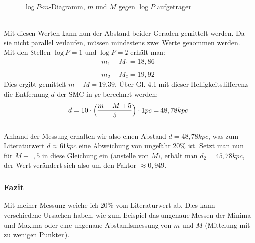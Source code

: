 \documentclass[12pt]{article}
\begin{document}
\begin{figure}[h!]
    \centering
{}
\caption[short]{$\log P$-$m$-Diagramm, $m$ und $M$ gegen $\log P$ aufgetragen}
\end{figure}\\
Mit diesen Werten kann nun der Abstand beider Geraden gemittelt werden. Da sie nicht parallel verlaufen, müssen mindestens zwei Werte genommen werden. Mit den Stellen $\log P = 1$ und $\log P = 2$ erhält man:\\
\[\begin{aligned}
    m_1-M_1 =  18,86\\\\
    m_2 - M_2 = 19,92
    \end{aligned}\]
Dies ergibt gemittelt $m-M = 19.39$. Über Gl. 4.1 mit dieser Helligkeitsdifferenz die Entfernung $d$ der SMC in $pc$ berechnet werden:
\[d=10\cdot \Bigl(\frac{m-M+5}{5}\Bigr) \cdot 1pc = 48,78 kpc\]\\
Anhand der Messung erhalten wir also einen Abstand $d = 48,78 kpc$, was zum Literaturwert $d \approx 61 kpc$ eine Abweichung von ungefähr $20 \%$ ist. Setzt man nun für $M-1,5$ in diese Gleichung ein (anstelle von $M$), erhält man $d_2 = 45,78kpc$, der Wert verändert sich also um den Faktor $\approx 0,949$.
\subsubsection*{Fazit}
Mit meiner Messung weiche ich $20 \%$ vom Literaturwert ab. Dies kann verschiedene Ursachen haben, wie zum Beispiel das ungenaue Messen der Minima und Maxima oder eine ungenaue Abstandsmessung von $m$ und $M$ (Mittelung mit zu wenigen Punkten).
\newpage\noindent
\end{document}
